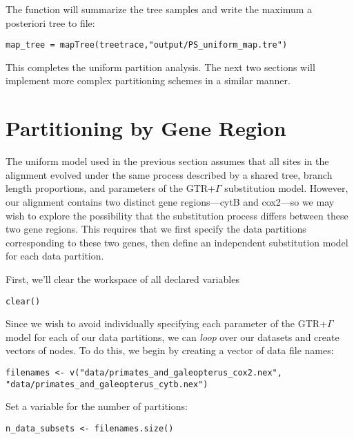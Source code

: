 The  function will summarize the tree samples and write the maximum a posteriori tree to file:
{\tt \begin{snugshade*}
\begin{lstlisting}
map_tree = mapTree(treetrace,"output/PS_uniform_map.tre")
\end{lstlisting}
\end{snugshade*}}

This completes the uniform partition analysis.
The next two sections will implement more complex partitioning schemes in a similar manner.


\section{Partitioning by Gene Region}\label{secByGene}

The uniform model used in the previous section assumes that all sites in the alignment evolved under the same process described by a shared tree, branch length proportions, and parameters of the GTR+$\Gamma$ substitution model.
However, our alignment contains two distinct gene regions---cytB and cox2---so we may wish to explore the possibility that the substitution process differs between these two gene regions.
This requires that we first specify the data partitions corresponding to these two genes, then define an independent substitution model for each data partition. 

First, we'll clear the workspace of all declared variables
{\tt \begin{snugshade*}
\begin{lstlisting}
clear()
\end{lstlisting}
\end{snugshade*}}

Since we wish to avoid individually specifying each parameter of the GTR+$\Gamma$ model for each of our data partitions, we can \textit{loop} over our datasets and create vectors of nodes.
To do this, we begin by creating a vector of data file names:
{\tt \begin{snugshade*}
\begin{lstlisting}
filenames <- v("data/primates_and_galeopterus_cox2.nex", "data/primates_and_galeopterus_cytb.nex")
\end{lstlisting}
\end{snugshade*}}

Set a variable for the number of partitions:
{\tt \begin{snugshade*}
\begin{lstlisting}
n_data_subsets <- filenames.size()
\end{lstlisting}
\end{snugshade*}}


